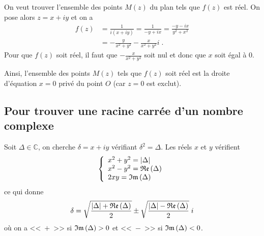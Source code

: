\begin{fiche}
\begin{ex}
                              On veut trouver l'ensemble des points $M(z)$ du plan tels que $f(z)$ est r\'eel.
                              On pose alors $z = x + i y$ et on a 
                              \begin{align*}
                                    f(z) & = \frac{1}{i(x+iy)}                        
                                           = \frac{1}{-y+ix}                          
                                           = \frac{-y-ix}{y^2 + x^2}                  \\
                                         & = -\frac{y}{x^2+y^2}-\frac{x}{x^2+y^2}i    \;.
                              \end{align*}
                              Pour que $f(z)$ soit r\'eel, il faut que $-\frac{x}{x^2+y^2}$ soit nul
                              et donc que $x$ soit \'egal \`a $0$.
                              
                              Ainsi, l'ensemble des points $M(z)$ tels que $f(z)$ soit r\'eel est 
                              la droite d'\'equation $x=0$ priv\'e du point $O$ (car $z=0$ est exclut).
                        \end{ex}
      \subsection*{Pour trouver une racine carr\'ee d'un nombre complexe}
            Soit $\Delta\in\mathbb{C}$, on cherche $\delta = x+iy$ v\'erifiant $\delta^2 = \Delta$.
            Les r\'eels $x$ et $y$ v\'erifient 
            \[
                  \left\lbrace
                        \begin{array}{l}
                              x^2 + y^2 = |\Delta|       \\
                              x^2 - y^2 = \mathfrak{Re}\left(\Delta\right)  \\
                              2 x y     = \mathfrak{Im}\left(\Delta\right)  
                        \end{array}
                  \right.
            \]
            ce qui donne
            \[
					\delta = \sqrt{\frac{|\Delta| + \mathfrak{Re}\left(\Delta\right)}{2}} \pm \sqrt{\frac{|\Delta| - \mathfrak{Re}\left(\Delta\right)}{2}} \; i
            \]
            o\`u on a <<~$+$~>> si $\mathfrak{Im}\left(\Delta\right) > 0$ et <<~$-$~>> si $\mathfrak{Im}\left(\Delta\right) < 0$.
            
      
      
      
      
      
      
      
      
      
      
      
      
      
\end{fiche}

